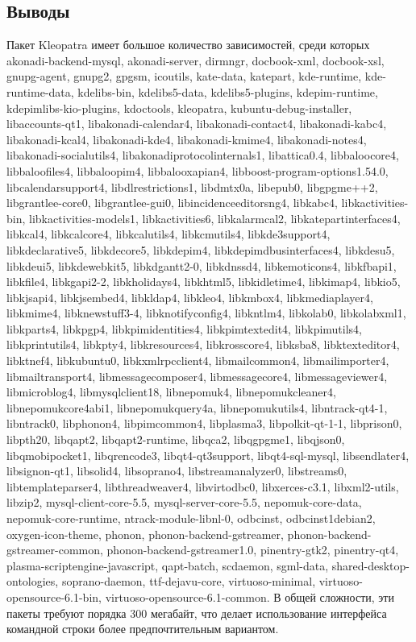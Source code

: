 \documentclass[12pt,a4paper]{article}
\begin{document}
\subsection{Выводы}
Пакет Kleopatra имеет большое количество зависимостей, среди которых akonadi-backend-mysql, akonadi-server, dirmngr, docbook-xml, docbook-xsl, gnupg-agent, gnupg2, gpgsm, icoutils, kate-data, katepart, kde-runtime, kde-runtime-data, kdelibs-bin, kdelibs5-data, kdelibs5-plugins, kdepim-runtime, kdepimlibs-kio-plugins, kdoctools, kleopatra, kubuntu-debug-installer, libaccounts-qt1, libakonadi-calendar4, libakonadi-contact4, libakonadi-kabc4, libakonadi-kcal4, libakonadi-kde4, libakonadi-kmime4, libakonadi-notes4, libakonadi-socialutils4, libakonadiprotocolinternals1, libattica0.4, libbaloocore4, libbaloofiles4, libbaloopim4, libbalooxapian4, libboost-program-options1.54.0, libcalendarsupport4, libdlrestrictions1, libdmtx0a, libepub0, libgpgme++2, libgrantlee-core0, libgrantlee-gui0, libincidenceeditorsng4, libkabc4, libkactivities-bin, libkactivities-models1, libkactivities6, libkalarmcal2, libkatepartinterfaces4, libkcal4, libkcalcore4, libkcalutils4, libkcmutils4, libkde3support4, libkdeclarative5, libkdecore5, libkdepim4, libkdepimdbusinterfaces4, libkdesu5, libkdeui5, libkdewebkit5, libkdgantt2-0, libkdnssd4, libkemoticons4, libkfbapi1, libkfile4, libkgapi2-2, libkholidays4, libkhtml5, libkidletime4, libkimap4, libkio5, libkjsapi4, libkjsembed4, libkldap4, libkleo4, libkmbox4, libkmediaplayer4, libkmime4, libknewstuff3-4, libknotifyconfig4, libkntlm4, libkolab0, libkolabxml1, libkparts4, libkpgp4, libkpimidentities4, libkpimtextedit4, libkpimutils4, libkprintutils4, libkpty4, libkresources4, libkrosscore4, libksba8, libktexteditor4, libktnef4, libkubuntu0, libkxmlrpcclient4, libmailcommon4, libmailimporter4, libmailtransport4, libmessagecomposer4, libmessagecore4, libmessageviewer4, libmicroblog4, libmysqlclient18, libnepomuk4, libnepomukcleaner4, libnepomukcore4abi1, libnepomukquery4a, libnepomukutils4, libntrack-qt4-1, libntrack0, libphonon4, libpimcommon4, libplasma3, libpolkit-qt-1-1, libprison0, libpth20, libqapt2, libqapt2-runtime, libqca2, libqgpgme1, libqjson0, libqmobipocket1, libqrencode3, libqt4-qt3support, libqt4-sql-mysql, libsendlater4, libsignon-qt1, libsolid4, libsoprano4, libstreamanalyzer0, libstreams0, libtemplateparser4, libthreadweaver4, libvirtodbc0, libxerces-c3.1, libxml2-utils, libzip2, mysql-client-core-5.5, mysql-server-core-5.5, nepomuk-core-data, nepomuk-core-runtime, ntrack-module-libnl-0, odbcinst, odbcinst1debian2, oxygen-icon-theme, phonon, phonon-backend-gstreamer, phonon-backend-gstreamer-common, phonon-backend-gstreamer1.0, pinentry-gtk2, pinentry-qt4, plasma-scriptengine-javascript, qapt-batch, scdaemon, sgml-data, shared-desktop-ontologies, soprano-daemon, ttf-dejavu-core, virtuoso-minimal, virtuoso-opensource-6.1-bin, virtuoso-opensource-6.1-common. В общей сложности, эти пакеты требуют порядка 300 мегабайт, что делает использование интерфейса командной строки более предпочтительным вариантом.
\end{document}
